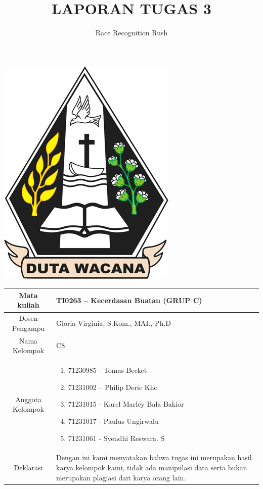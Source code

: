 \documentclass{article}
\title{\textbf{LAPORAN TUGAS 3}}
\author{Race Recognition Rush}
\date{}
\begin{document}
\maketitle
\begin{center}
    \includegraphics[scale=0.4]{logo-ukdw.png}
\end{center}

\begin{table}[h]
    \centering
    \renewcommand{\arraystretch}{1.5}
    \begin{tabularx}{\textwidth}{|c|X|}
        \hline
        Mata kuliah	& TI0263 – Kecerdasan Buatan (GRUP C) \\
        \hline
        Dosen Pengampu & Gloria Virginia, S.Kom., MAI., Ph.D \\
        \hline
        Nama Kelompok & C8 \\
        \hline 
        Anggota Kelompok & 
        \begin{minipage}{\textwidth}
            \vspace{5px}
            \begin{enumerate}
                \item 71230985 - Tomas Becket
                \item 71231002 – Philip Deric Kho  
                \item 71231015 - Karel Marley Bala Bakior
                \item 71231017 - Paulus Ungirwalu
                \item 71231061 - Syendhi Reswara. S
            \end{enumerate}
            \vspace{5px}
        \end{minipage} \\
        \hline
        Deklarasi & Dengan ini kami menyatakan bahwa tugas ini merupakan hasil karya kelompok kami, tidak ada manipulasi data serta bukan merupakan plagiasi dari karya orang lain. \\
        \hline
    \end{tabularx}
\end{table}
\end{document}
